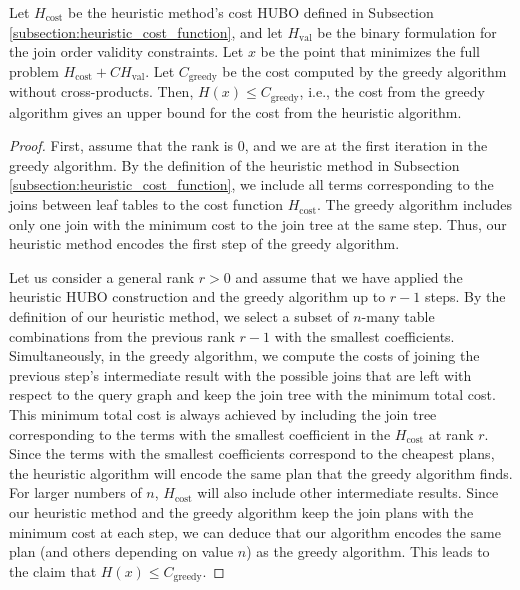 \begin{theorem}\label{thm:greedy_bound}
Let $H_{\text{cost}}$ be the heuristic method's cost HUBO defined in Subsection \ref{subsection:heuristic_cost_function}, and let $H_{\text{val}}$ be the binary formulation for the join order validity constraints. Let $x$ be the point that minimizes the full problem $H_{\text{cost}} + CH_{\text{val}}$. Let $C_{\text{greedy}}$ be the cost computed by the greedy algorithm without cross-products. Then, $H(x) \leq C_{\text{greedy}}$, i.e., the cost from the greedy algorithm gives an upper bound for the cost from the heuristic algorithm.
\end{theorem}
\begin{proof}
First, assume that the rank is $0$, and we are at the first iteration in the greedy algorithm. By the definition of the heuristic method in Subsection \ref{subsection:heuristic_cost_function}, we include all terms corresponding to the joins between leaf tables to the cost function $H_{\text{cost}}$. The greedy algorithm includes only one join with the minimum cost to the join tree at the same step. Thus, our heuristic method encodes the first step of the greedy algorithm.

Let us consider a general rank $r > 0$ and assume that we have applied the heuristic HUBO construction and the greedy algorithm up to $r - 1$ steps. By the definition of our heuristic method, we select a subset of $n$-many table combinations from the previous rank $r - 1$ with the smallest coefficients. Simultaneously, in the greedy algorithm, we compute the costs of joining the previous step's intermediate result with the possible joins that are left with respect to the query graph and keep the join tree with the minimum total cost. This minimum total cost is always achieved by including the join tree corresponding to the terms with the smallest coefficient in the $H_{\text{cost}}$ at rank $r$. Since the terms with the smallest coefficients correspond to the cheapest plans, the heuristic algorithm will encode the same plan that the greedy algorithm finds. For larger numbers of $n$, $H_{\text{cost}}$ will also include other intermediate results. Since our heuristic method and the greedy algorithm keep the join plans with the minimum cost at each step, we can deduce that our algorithm encodes the same plan (and others depending on value $n$) as the greedy algorithm. This leads to the claim that $H(x) \leq C_{\text{greedy}}$.
\end{proof}

